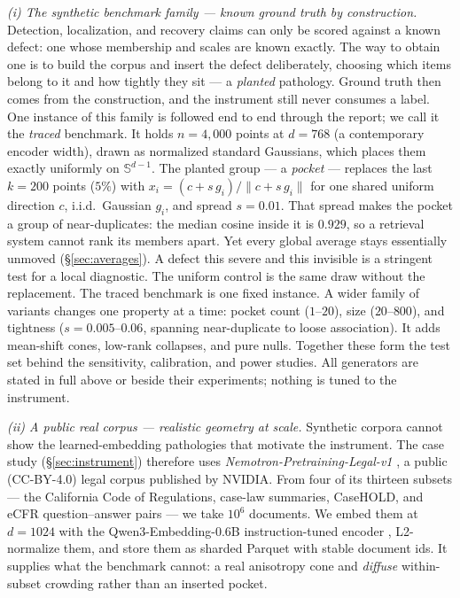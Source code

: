 \documentclass[11pt,letterpaper]{article}
\newcommand{\sphere}{\mathbb{S}^{d-1}}
\begin{document}
\emph{(i) The synthetic benchmark family --- known ground truth by
construction.} Detection, localization, and recovery claims can only be scored against a known
defect: one whose membership and scales are known exactly. The
way to obtain one is to build the corpus and insert the defect
deliberately, choosing which items belong to it and how tightly they sit
--- a \emph{planted} pathology. Ground truth then comes from the
construction, and the instrument still never consumes a label. One
instance of this family is followed end to end through the report; we call
it the \emph{traced} benchmark. It holds $n = 4{,}000$ points at $d = 768$
(a contemporary encoder width), drawn as normalized standard Gaussians,
which places them exactly uniformly on $\sphere$. The planted group --- a
\emph{pocket} --- replaces the last $k = 200$ points ($5\%$) with $x_i =
(c + s\, g_i)/\lVert c + s\, g_i\rVert$ for one shared uniform direction
$c$, i.i.d.\ Gaussian $g_i$, and spread $s = 0.01$. That spread makes the
pocket a group of near-duplicates: the median cosine inside it is $0.929$,
so a retrieval system cannot rank its members apart. Yet every global
average stays essentially unmoved (\S\ref{sec:averages}). A defect this
severe and this invisible is a stringent test for a local diagnostic. The
uniform control is the same draw without the replacement. The traced benchmark is one fixed instance. A wider family of variants
changes one property at a time: pocket count ($1$--$20$), size
($20$--$800$), and tightness ($s = 0.005$--$0.06$, spanning near-duplicate
to loose association). It adds mean-shift cones, low-rank collapses, and
pure nulls. Together these form the test set behind the sensitivity, calibration,
and power studies. All generators are stated in full above or
beside their experiments; nothing is tuned to the instrument.

\emph{(ii) A public real corpus --- realistic geometry at scale.}
Synthetic corpora cannot show the learned-embedding pathologies that
motivate the instrument. The case study (\S\ref{sec:instrument}) therefore
uses \emph{Nemotron-Pretraining-Legal-v1} \cite{nemotronlegal}, a public
(CC-BY-4.0) legal corpus published by NVIDIA. From four of its thirteen
subsets --- the California Code of Regulations, case-law summaries,
CaseHOLD, and eCFR question--answer pairs --- we take $10^6$ documents. We
embed them at $d = 1024$ with the Qwen3-Embedding-0.6B instruction-tuned
encoder \cite{qwen3embedding}, L2-normalize them, and store them as
sharded Parquet with stable document ids. It supplies what the benchmark cannot: a real anisotropy cone and
\emph{diffuse} within-subset crowding rather than an inserted pocket.
\end{document}
